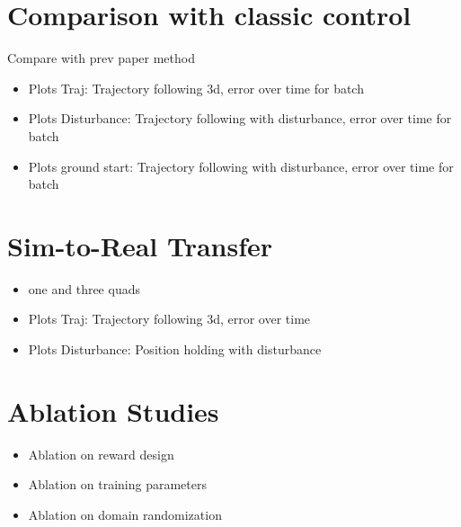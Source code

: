\section{Comparison with classic control}
Compare with prev paper method \autocite{Wahba2024}
\begin{itemize}
    \item Plots Traj: Trajectory following 3d, error over time for batch
    \item Plots Disturbance: Trajectory following with disturbance, error over time for batch
    \item Plots ground start: Trajectory following with disturbance, error over time for batch
\end{itemize} 
\section{Sim-to-Real Transfer}
\begin{itemize}
    \item one and three quads
    \item Plots Traj: Trajectory following 3d,  error over time 
    \item Plots Disturbance: Position holding with disturbance
\end{itemize}


\section{Ablation Studies}
\begin{itemize}
    \item Ablation on reward design
    \item Ablation on training parameters
    \item Ablation on domain randomization
    
\end{itemize}